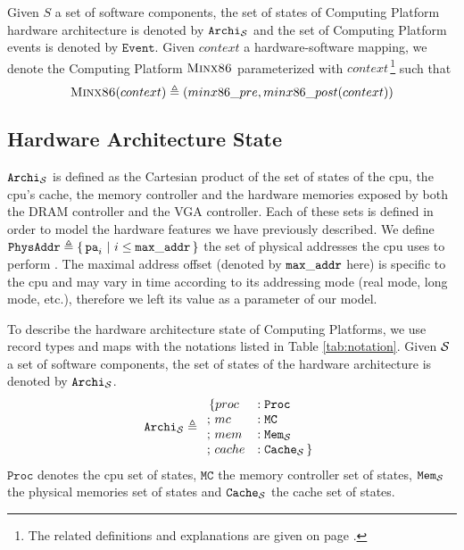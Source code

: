 Given $S$ a set of software components, the set of states of 
Computing Platform hardware architecture is denoted by
$\texttt{Archi}_{\mathcal{S}}$ and the set of  Computing Platform
events is denoted by $\texttt{Event}$.
%
Given $context$ a hardware-software mapping, we denote the Computing Platform
$\textsc{Minx86}$ parameterized with $context$\,\footnote{The related
  definitions and explanations are given on page \pageref{page:minx86def}.} such
that
%
\[
  \textsc{Minx86}(context) \triangleq (minx86\_pre, minx86\_post(context))
\]

\subsection{Hardware Architecture State}

$\texttt{Archi}_{\mathcal{S}}$ is defined as the Cartesian product of the set of
states of the \ac{cpu}, the \ac{cpu}'s cache, the memory controller and the
hardware memories exposed by both the DRAM controller and the VGA controller.
%
Each of these sets is defined in order to model the hardware features we have
previously described.
%
We define
$\texttt{PhysAddr} \triangleq \{\,\mathtt{pa}_i\ |\ i \leq \mathtt{max\_addr}\,\}$ the
set of physical addresses the \ac{cpu} uses to perform \IO.
%
The maximal address offset (denoted by $\mathtt{max\_addr}$ here) is specific to
the \ac{cpu} and may vary in time according to its addressing mode (real mode,
long mode, etc.), therefore we left its value as a parameter of our model.

To describe the hardware architecture state of  Computing
Platforms, we use record types and maps with the notations listed in Table
\ref{tab:notation}.
%
Given $\mathcal{S}$ a set of software components, the set of states of the hardware
architecture is denoted by $\texttt{Archi}_{\mathcal{S}}$.
%
\[
  \texttt{Archi}_{\mathcal{S}} \triangleq
  \begin{array}{ll}
    \,\{proc &: \texttt{Proc}          \\
    ;\,mc    &: \texttt{MC}            \\
    ;\,mem   &: \texttt{Mem}_{\mathcal{S}} \\
    ;\,cache &: \texttt{Cache}_{\mathcal{S}}\,\}
  \end{array}
\]
%
$\texttt{Proc}$ denotes the \ac{cpu} set of states, $\texttt{MC}$ the memory
controller set of states, $\texttt{Mem}_{\mathcal{S}}$ the physical memories set of
states and $\texttt{Cache}_{\mathcal{S}}$ the cache set of states.

